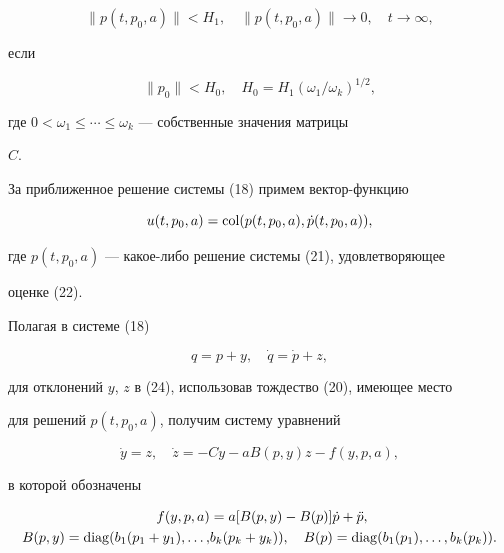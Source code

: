 \begin{equation} 


\|p(t,p_0,a)\|<H_1,\quad \|p(t,p_0,a)\|\to 0,\quad 


t\to \infty, 


\end{equation} 


если 


$$ 


\|p_0\|<H_0,\quad H_0=H_1(\omega_1/\omega_k)^{1/2}, 


$$  


где $0<\omega_1\le\dotsb\le\omega_k$ --- собственные значения матрицы 


$C$. 


За приближенное решение системы (18) примем вектор-функцию 


\begin{equation} 


u(t,p_0,a)=\col(p(t,p_0,a),\Dot p(t,p_0,a)), 


\end{equation} 


где $p(t,p_0,a)$ --- какое-либо решение системы (21), удовлетворяющее 


оценке (22). 


Полагая в системе (18) 


\begin{equation} 


q=p+y,\quad \Dot q=\Dot p+z,


\end{equation} 


для отклонений $y$, $z$ в (24), использовав тождество (20), имеющее место 


для решений $p(t,p_0,a)$, получим систему уравнений 


\begin{equation} 


\Dot y=z,\quad \Dot z=-C y-a B(p,y)z-f(y,p,a), 


\end{equation} 


в которой обозначены 


\begin{equation} 


\begin{split}


f(y,p,a)&=a[B(p,y)-B(p)]\Dot p+\Ddot p,\\ 


B(p,y)=\diag(b_1(p_1+y_1),\dotsc,& b_k(p_k+y_k)),\quad 


B(p)=\diag(b_1(p_1),\dotsc,b_k(p_k)). 


\end{split} 


\end{equation} 


